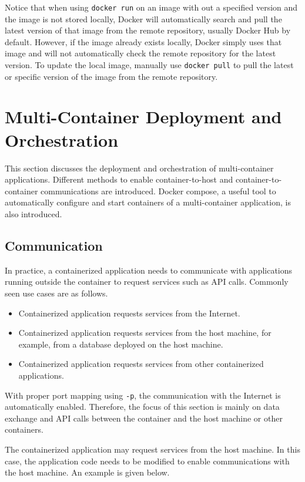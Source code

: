Notice that when using \verb|docker run| on an image with out a specified version and the image is not stored locally, Docker will automatically search and pull the latest version of that image from the remote repository, usually Docker Hub by default. However, if the image already exists locally, Docker simply uses that image and will not automatically check the remote repository for the latest version. To update the local image, manually use \verb|docker pull| to pull the latest or specific version of the image from the remote repository.

\section{Multi-Container Deployment and Orchestration}

This section discusses the deployment and orchestration of multi-container applications. Different methods to enable container-to-host and container-to-container communications are introduced. Docker compose, a useful tool to automatically configure and start containers of a multi-container application, is also introduced.

\subsection{Communication}

In practice, a containerized application needs to communicate with applications running outside the container to request services such as API calls. Commonly seen use cases are as follows.
\begin{itemize}
	\item Containerized application requests services from the Internet.
	\item Containerized application requests services from the host machine, for example, from a database deployed on the host machine.
	\item Containerized application requests services from other containerized applications.
\end{itemize}

With proper port mapping using \verb|-p|, the communication with the Internet is automatically enabled. Therefore, the focus of this section is mainly on data exchange and API calls between the container and the host machine or other containers.

The containerized application may request services from the host machine. In this case, the application code needs to be modified to enable communications with the host machine. An example is given below.


